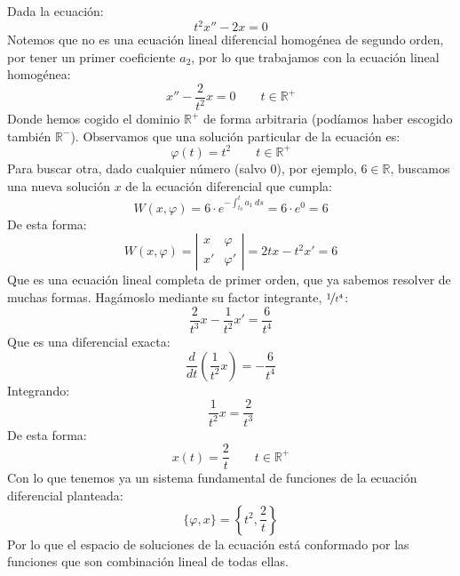 \begin{ejemplo}
    Dada la ecuación:
    \begin{equation*}
        t^2 x'' - 2x = 0
    \end{equation*}
    Notemos que no es una ecuación lineal diferencial homogénea de segundo orden, por tener un primer coeficiente $a_2$, por lo que trabajamos con la ecuación lineal homogénea:
    \begin{equation*}
        x'' - \dfrac{2}{t^2}x = 0 \qquad t\in \mathbb{R}^+
    \end{equation*}
    Donde hemos cogido el dominio $\mathbb{R}^+$ de forma arbitraria (podíamos haber escogido también $\mathbb{R}^-$). Observamos que una solución particular de la ecuación es:
    \begin{equation*}
        \varphi(t) = t^2 \qquad t\in \mathbb{R}^+
    \end{equation*}
    Para buscar otra, dado cualquier número (salvo 0), por ejemplo, $6\in \mathbb{R}$, buscamos una nueva solución $x$ de la ecuación diferencial que cumpla:
    \begin{equation*}
        W(x,\varphi) = 6 \cdot e^{-\displaystyle \int_{t_0}^{t} a_{1}~ds } = 6\cdot e^0 = 6
    \end{equation*}
    De esta forma:
    \begin{equation*}
        W(x,\varphi) = \left|\begin{array}{cc}
            x & \varphi \\
            x' & \varphi' 
        \end{array}\right| = 2tx - t^2 x' = 6
    \end{equation*}
    Que es una ecuación lineal completa de primer orden, que ya sabemos resolver de muchas formas. Hagámoslo mediante su factor integrante, $\nicefrac{1}{t^4}$:
    \begin{equation*}
        \dfrac{2}{t^3}x - \dfrac{1}{t^2}x' = \dfrac{6}{t^4}
    \end{equation*}
    Que es una diferencial exacta:
    \begin{equation*}
        \dfrac{d}{dt}\left(\dfrac{1}{t^2}x\right) = -\dfrac{6}{t^4}
    \end{equation*}
    Integrando:
    \begin{equation*}
        \dfrac{1}{t^2}x = \dfrac{2}{t^3}
    \end{equation*}
    De esta forma:
    \begin{equation*}
        x(t) = \dfrac{2}{t} \qquad t\in \mathbb{R}^+
    \end{equation*}
    Con lo que tenemos ya un sistema fundamental de funciones de la ecuación diferencial planteada:
    \begin{equation*}
        \{\varphi, x\} = \left\{t^2, \dfrac{2}{t}\right\}
    \end{equation*}
    Por lo que el espacio de soluciones de la ecuación está conformado por las funciones que son combinación lineal de todas ellas.
\end{ejemplo}

